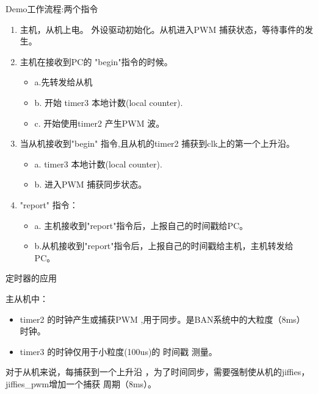 \begin{frame}[fragile]{Demo工作流程:两个指令}

\begin{enumerate}
\item 主机，从机上电。 外设驱动初始化。从机进入PWM 捕获状态，等待事件的发生。
\item 主机在接收到PC的 "begin"指令的时候。
  \begin{itemize}
    \item a.先转发给从机
    \item b. 开始 timer3 本地计数(local counter).
    \item c. 开始使用timer2 产生PWM 波。
  \end{itemize}
\item 当从机接收到"begin" 指令,且从机的timer2 捕获到clk上的第一个上升沿。
  \begin{itemize}
    \item a.  timer3 本地计数(local counter).
    \item b. 进入PWM 捕获同步状态。
  \end{itemize}
\item "report" 指令：
\begin{itemize}
  \item a. 主机接收到"report"指令后，上报自己的时间戳给PC。
  \item b.从机接收到"report"指令后，上报自己的时间戳给主机，主机转发给PC。
\end{itemize}

\end{enumerate}


\end{frame}




\begin{frame}[fragile]{定时器的应用}

主从机中：
\begin{itemize}
  \item timer2 的时钟产生或捕获PWM ,用于同步。是BAN系统中的大粒度（8ms）时钟。
  \item timer3 的时钟仅用于小粒度(100us)的 时间戳 测量。
\end{itemize}


对于从机来说，每捕获到一个上升沿 ，为了时间同步，需要强制使从机的jiffies，jiffies\_pwm增加一个捕获
周期（8ms）。


\end{frame}




